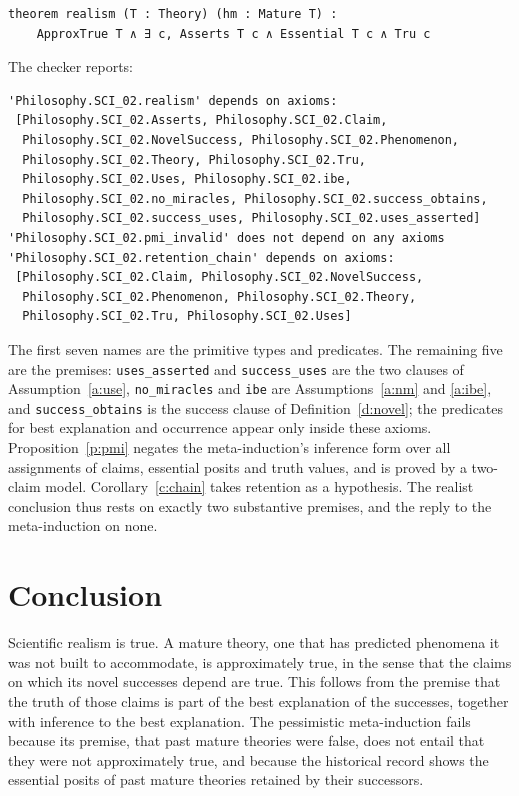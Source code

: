 \documentclass{situationist-preprint}
\begin{document}
\begin{lstlisting}
theorem realism (T : Theory) (hm : Mature T) :
    ApproxTrue T ∧ ∃ c, Asserts T c ∧ Essential T c ∧ Tru c
\end{lstlisting}

\noindent The checker reports:

\begin{lstlisting}
'Philosophy.SCI_02.realism' depends on axioms:
 [Philosophy.SCI_02.Asserts, Philosophy.SCI_02.Claim,
  Philosophy.SCI_02.NovelSuccess, Philosophy.SCI_02.Phenomenon,
  Philosophy.SCI_02.Theory, Philosophy.SCI_02.Tru,
  Philosophy.SCI_02.Uses, Philosophy.SCI_02.ibe,
  Philosophy.SCI_02.no_miracles, Philosophy.SCI_02.success_obtains,
  Philosophy.SCI_02.success_uses, Philosophy.SCI_02.uses_asserted]
'Philosophy.SCI_02.pmi_invalid' does not depend on any axioms
'Philosophy.SCI_02.retention_chain' depends on axioms:
 [Philosophy.SCI_02.Claim, Philosophy.SCI_02.NovelSuccess,
  Philosophy.SCI_02.Phenomenon, Philosophy.SCI_02.Theory,
  Philosophy.SCI_02.Tru, Philosophy.SCI_02.Uses]
\end{lstlisting}

The first seven names are the primitive types and predicates. The remaining five are the premises: \texttt{uses\_asserted} and \texttt{success\_uses} are the two clauses of Assumption~\ref{a:use}, \texttt{no\_miracles} and \texttt{ibe} are Assumptions~\ref{a:nm} and \ref{a:ibe}, and \texttt{success\_obtains} is the success clause of Definition~\ref{d:novel}; the predicates for best explanation and occurrence appear only inside these axioms. Proposition~\ref{p:pmi} negates the meta-induction's inference form over all assignments of claims, essential posits and truth values, and is proved by a two-claim model. Corollary~\ref{c:chain} takes retention as a hypothesis. The realist conclusion thus rests on exactly two substantive premises, and the reply to the meta-induction on none.

\section{Conclusion}

Scientific realism is true. A mature theory, one that has predicted phenomena it was not built to accommodate, is approximately true, in the sense that the claims on which its novel successes depend are true. This follows from the premise that the truth of those claims is part of the best explanation of the successes, together with inference to the best explanation. The pessimistic meta-induction fails because its premise, that past mature theories were false, does not entail that they were not approximately true, and because the historical record shows the essential posits of past mature theories retained by their successors.
\end{document}
